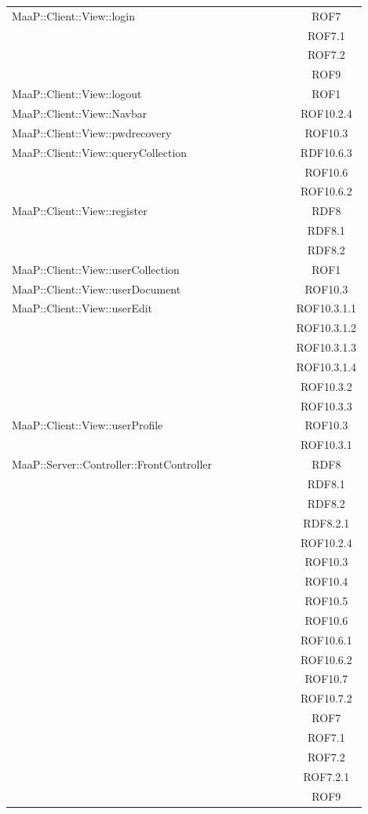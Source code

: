 \begin{center}
\begin{longtable}{|p{0.8\linewidth}|c|}
\midrule
MaaP::Client::View::login
& ROF7\\
& ROF7.1\\
& ROF7.2\\
& ROF9\\

\midrule
MaaP::Client::View::logout
& ROF1\\

\midrule
MaaP::Client::View::Navbar
& ROF10.2.4\\

\midrule
MaaP::Client::View::pwdrecovery
& ROF10.3\\


\midrule
MaaP::Client::View::queryCollection
& RDF10.6.3\\
& ROF10.6\\
& ROF10.6.2\\

\midrule
MaaP::Client::View::register
& RDF8\\
& RDF8.1\\
& RDF8.2\\

\midrule
MaaP::Client::View::userCollection
& ROF1\\

\midrule
MaaP::Client::View::userDocument
& ROF10.3\\

\midrule
MaaP::Client::View::userEdit
& ROF10.3.1.1\\
& ROF10.3.1.2\\
& ROF10.3.1.3\\
& ROF10.3.1.4\\
& ROF10.3.2\\
& ROF10.3.3\\

\midrule
MaaP::Client::View::userProfile
& ROF10.3\\
& ROF10.3.1\\

\midrule
MaaP::Server::Controller::FrontController
& RDF8\\
& RDF8.1\\
& RDF8.2\\
& RDF8.2.1\\
& ROF10.2.4\\
& ROF10.3\\
& ROF10.4\\
& ROF10.5\\
& ROF10.6\\
& ROF10.6.1\\
& ROF10.6.2\\
& ROF10.7\\
& ROF10.7.2\\
& ROF7\\
& ROF7.1\\
& ROF7.2\\
& ROF7.2.1\\
& ROF9\\


\end{longtable}
\end{center}
